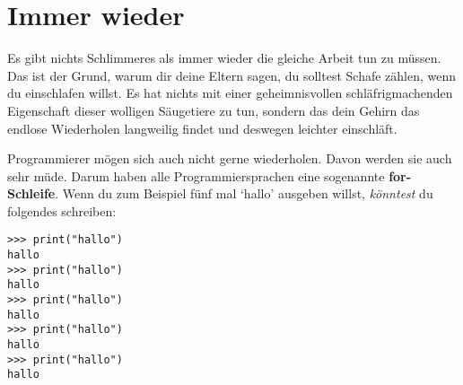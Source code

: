 

\chapter{Immer wieder}\label{ch:againandagain}

Es gibt nichts Schlimmeres als immer wieder die gleiche Arbeit tun zu müssen. Das ist der Grund, warum dir deine Eltern sagen, du solltest Schafe zählen, wenn du einschlafen willst. Es hat nichts mit einer geheimnisvollen schläfrigmachenden Eigenschaft dieser wolligen Säugetiere zu tun, sondern das dein Gehirn das endlose Wiederholen langweilig findet und deswegen leichter einschläft.
\par
Programmierer mögen sich auch nicht gerne wiederholen. Davon werden sie auch sehr müde. Darum haben alle Programmiersprachen eine sogenannte \textbf{for-Schleife}. Wenn du zum Beispiel fünf mal `hallo' ausgeben willst, \emph{könntest} du folgendes schreiben:

\begin{Verbatim}[frame=single]
>>> print("hallo")
hallo
>>> print("hallo")
hallo
>>> print("hallo")
hallo
>>> print("hallo")
hallo
>>> print("hallo")
hallo
\end{Verbatim}

